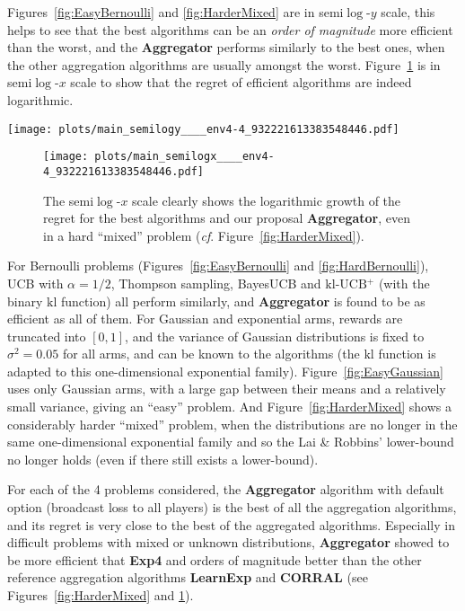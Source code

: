 \documentclass[conference]{IEEEtran}
\theoremstyle{plain}  %
\newcommand{\kl}[0]{\ensuremath{\mathrm{kl}}}
\newcommand{\klUCB}[0]{$\mathrm{kl}$-$\mathrm{UCB}$}
\newcommand{\Aggr}[0]{\textbf{Aggregator}}
\newcommand{\ExpQ}[0]{\textbf{Exp4}}
\newcommand{\CORRAL}[0]{\textbf{CORRAL}}
\newcommand{\LearnExp}[0]{\textbf{LearnExp}}
\begin{document}
Figures~\ref{fig:EasyBernoulli} and \ref{fig:HarderMixed} are in semi$\log$-$y$ scale, this helps to see that the best algorithms can be an \emph{order of magnitude} more efficient than the worst, and the \Aggr{} performs similarly to the best ones, when the other aggregation algorithms are usually amongst the worst.
Figure~\ref{fig:HarderMixed_semilogx} is in semi$\log$-$x$ scale to show that the regret of efficient algorithms are indeed logarithmic.

\begin{figure*}[h!]  %
	\centering
	\texttt{[image: plots/main\_semilogy\_\_\_\_env4-4\_932221613383548446.pdf]}
	\caption{\small On a harder problem, mixing Bernoulli, Gaussian, Exponential arms, with 3 arms of each types with the \emph{same mean}.}
	\label{fig:HarderMixed}
\end{figure*}

\begin{figure}[b!]  %
	\texttt{[image: plots/main\_semilogx\_\_\_\_env4-4\_932221613383548446.pdf]}
	\caption{\small The semi$\log$-$x$ scale clearly shows the logarithmic growth of the regret for the best algorithms and our proposal \Aggr, even in a hard ``mixed'' problem (\emph{cf}. Figure~\ref{fig:HarderMixed}).}
	\label{fig:HarderMixed_semilogx}
\end{figure}

For Bernoulli problems (Figures~\ref{fig:EasyBernoulli} and \ref{fig:HardBernoulli}), UCB with $\alpha=1/2$, Thompson sampling, BayesUCB and \klUCB{}$^+$ (with the binary $\kl$ function) all perform similarly, and \Aggr{} is found to be as efficient as all of them.
For Gaussian and exponential arms, rewards are truncated into $[0,1]$, and the variance of Gaussian distributions is fixed to $\sigma^2 = 0.05$ for all arms, and can be known to the algorithms (the \kl{} function is adapted to this one-dimensional exponential family).
%
Figure~\ref{fig:EasyGaussian} uses only Gaussian arms, with a large gap between their means and a relatively small variance, giving an ``easy'' problem.
%
And Figure~\ref{fig:HarderMixed} shows a considerably harder ``mixed'' problem, when the distributions are no longer in the same one-dimensional exponential family and so the Lai \& Robbins' lower-bound no longer holds (even if there still exists a lower-bound).

For each of the 4 problems considered, the \Aggr{} algorithm with default option (broadcast loss to all players) is the best of all the aggregation algorithms,
and its regret is very close to the best of the aggregated algorithms.
Especially in difficult problems with mixed or unknown distributions, \Aggr{} showed to be more efficient that \ExpQ{} and orders of magnitude better than the other reference aggregation algorithms \LearnExp{} and \CORRAL{} (see Figures~\ref{fig:HarderMixed} and \ref{fig:HarderMixed_semilogx}).
\end{document}
